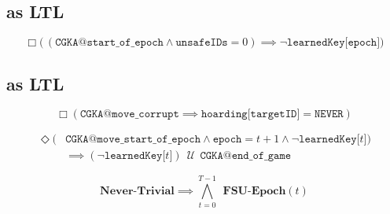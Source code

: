 \hypertarget{pcs-as-ltl}{%
\subsection{ as LTL}\label{pcs-as-ltl}}

\begin{LTL}
    $$
    \Box \Big(\, ( \texttt{CGKA@start\_of\_epoch} \land \texttt{unsafeIDs} = 0 ) \implies \neg \texttt{learnedKey[epoch]} \Big)
    $$
\end{LTL}


\hypertarget{fsu-as-ltl}{%
\subsection{ as LTL}\label{fsu-as-ltl}}

\begin{LTL}
    $$
    \Box \left( \texttt{CGKA@move\_corrupt} \implies \texttt{hoarding[targetID]} = \texttt{NEVER} \right)
    $$
\end{LTL}

\begin{LTL}
    \begin{equation*}
    \begin{split}
    \Diamond ( & \texttt{CGKA@move\_start\_of\_epoch} \land \texttt{epoch} = t + 1 \land \neg \texttt{learnedKey[$t$]} ) \\
    & \implies ( \neg \texttt{learnedKey[$t$]} ) \,\;{\mathcal {U}}\;\, \texttt{CGKA@end\_of\_game}
    \end{split}
    \end{equation*}
\end{LTL}

\begin{LTL}
    $$
    \textbf{Never-Trivial} \implies \bigwedge\limits_{t=0}^{T-1} \;\,\textbf{FSU-Epoch}(t)
    $$
\end{LTL}
